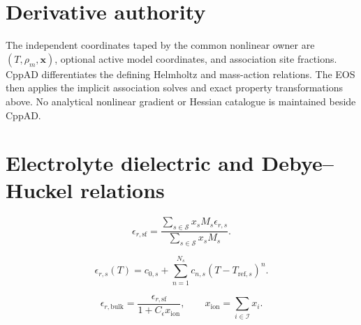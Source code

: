 \documentclass[11pt]{article}
\begin{document}
\section{Derivative authority}

The independent coordinates taped by the common nonlinear owner are
$(T,\rho_m,\boldsymbol{x})$, optional active model coordinates, and association
site fractions. CppAD differentiates the defining Helmholtz and mass-action
relations. The EOS then applies the implicit association solves and exact
property transformations above. No analytical nonlinear gradient or Hessian
catalogue is maintained beside CppAD.

\section{Electrolyte dielectric and Debye--Huckel relations}

\begin{equation}
\epsilon_{r,\mathrm{sf}}=
\frac{\sum_{s\in\mathcal{S}}x_sM_s\epsilon_{r,s}}
{\sum_{s\in\mathcal{S}}x_sM_s}.
\label{eq:salt_free_solvent_permittivity}
\end{equation}

\begin{equation}
\epsilon_{r,s}(T)=c_{0,s}+\sum_{n=1}^{N_s}c_{n,s}
(T-T_{\mathrm{ref},s})^n.
\label{eq:component_permittivity_temperature_polynomial}
\end{equation}

\begin{equation}
\epsilon_{r,\mathrm{bulk}}=
\frac{\epsilon_{r,\mathrm{sf}}}
{1+C_\epsilon x_{\mathrm{ion}}},
\qquad
x_{\mathrm{ion}}=\sum_{i\in\mathcal{I}}x_i.
\label{eq:ion_fraction_suppressed_bulk_permittivity}
\end{equation}
\end{document}
